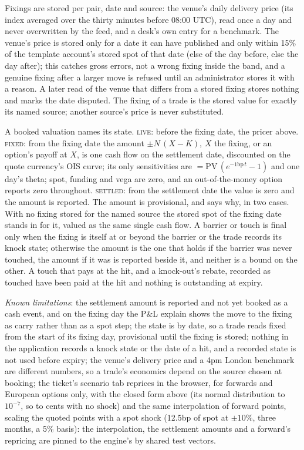 \documentclass[11pt,a4paper]{article}
\newcommand{\code}[1]{\ifmmode\text{\small\texttt{\detokenize{#1}}}\else{\small\path{#1}}\fi}
\begin{document}
Fixings are stored per pair, date and source: the venue's daily delivery price (its index averaged over the thirty minutes before 08:00 UTC), read once a day and never overwritten by the feed, and a desk's own entry for a benchmark. The venue's price is stored only for a date it can have published and only within 15\% of the template account's stored spot of that date (else of the day before, else the day after); this catches gross errors, not a wrong fixing inside the band, and a genuine fixing after a larger move is refused until an administrator stores it with a reason. A later read of the venue that differs from a stored fixing stores nothing and marks the date disputed. The fixing of a trade is the stored value for exactly its named source; another source's price is never substituted.

A booked valuation names its state. \textsc{live}: before the fixing date, the pricer above. \textsc{fixed}: from the fixing date the amount $\pm N\,(X-K)$, $X$ the fixing, or an option's payoff at $X$, is one cash flow on the settlement date, discounted on the quote currency's OIS curve; its only sensitivities are \code{IR01} $=\mathrm{PV}\,(e^{-1\mathrm{bp}\,t}-1)$ and one day's theta; spot, funding and vega are zero, and an out-of-the-money option reports zero throughout. \textsc{settled}: from the settlement date the value is zero and the amount is reported. The amount is provisional, and says why, in two cases. With no fixing stored for the named source the stored spot of the fixing date stands in for it, valued as the same single cash flow. A barrier or touch is final only when the fixing is itself at or beyond the barrier or the trade records its knock state; otherwise the amount is the one that holds if the barrier was never touched, the amount if it was is reported beside it, and neither is a bound on the other. A touch that pays at the hit, and a knock-out's rebate, recorded as touched have been paid at the hit and nothing is outstanding at expiry.

\emph{Known limitations}: the settlement amount is reported and not yet booked as a cash event, and on the fixing day the P\&L explain shows the move to the fixing as carry rather than as a spot step; the state is by date, so a trade reads fixed from the start of its fixing day, provisional until the fixing is stored; nothing in the application records a knock state or the date of a hit, and a recorded state is not used before expiry; the venue's delivery price and a 4pm London benchmark are different numbers, so a trade's economics depend on the source chosen at booking; the ticket's scenario tab reprices in the browser, for forwards and European options only, with the closed form above (its normal distribution to $10^{-7}$, so to cents with no shock) and the same interpolation of forward points, scaling the quoted points with a spot shock (12.5bp of spot at $\pm10\%$, three months, a 5\% basis): the interpolation, the settlement amounts and a forward's repricing are pinned to the engine's by shared test vectors.
\end{document}
